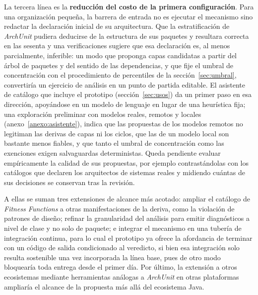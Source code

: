 La tercera línea es la \textbf{reducción del costo de la primera configuración}. Para una organización pequeña, la barrera de entrada no es ejecutar el mecanismo sino redactar la declaración inicial de su arquitectura. Que la estratificación de \textit{ArchUnit} pudiera deducirse de la estructura de sus paquetes y resultara correcta en las sesenta y una verificaciones sugiere que esa declaración es, al menos parcialmente, inferible: un modo que proponga capas candidatas a partir del árbol de paquetes y del sentido de las dependencias, y que fije el umbral de concentración con el procedimiento de percentiles de la sección~\ref{sec:umbral}, convertiría un ejercicio de análisis en un punto de partida editable. El asistente de catálogo que incluye el prototipo (sección~\ref{sec:usos}) da un primer paso en esa dirección, apoyándose en un modelo de lenguaje en lugar de una heurística fija; una exploración preliminar con modelos reales, remotos y locales (anexo~\ref{anexo:asistente}), indica que las propuestas de los modelos remotos no legitiman las derivas de capas ni los ciclos, que las de un modelo local son bastante menos fiables, y que tanto el umbral de concentración como las exenciones exigen salvaguardas deterministas. Queda pendiente evaluar empíricamente la calidad de sus propuestas, por ejemplo contrastándolas con los catálogos que declaren los arquitectos de sistemas reales y midiendo cuántas de sus decisiones se conservan tras la revisión.

A ellas se suman tres extensiones de alcance más acotado: ampliar el catálogo de \textit{Fitness Functions} a otras manifestaciones de la deriva, como la violación de patrones de diseño; refinar la granularidad del análisis para emitir diagnósticos a nivel de clase y no solo de paquete; e integrar el mecanismo en una tubería de integración continua, para lo cual el prototipo ya ofrece la afordancia de terminar con un código de salida condicionado al veredicto, si bien esa integración solo resulta sostenible una vez incorporada la línea base, pues de otro modo bloquearía toda entrega desde el primer día. Por último, la extensión a otros ecosistemas mediante herramientas análogas a \textit{ArchUnit} en otras plataformas \citep{SugumarMedium} ampliaría el alcance de la propuesta más allá del ecosistema Java.

